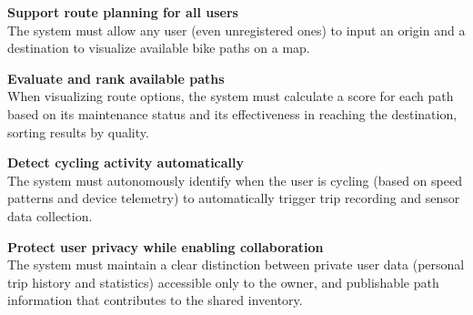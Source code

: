 \begin{enumerate}[label=\textbf{[G\arabic*]:}]
    \item \textbf{Support route planning for all users}
    \\
    The system must allow any user (even unregistered ones) to input an origin and a destination to visualize available bike paths on a map.

    \item \textbf{Evaluate and rank available paths}
    \\
    When visualizing route options, the system must calculate a score for each path based on its maintenance status and its effectiveness in reaching the destination, sorting results by quality.

    \item \textbf{Detect cycling activity automatically}
    \\
    The system must autonomously identify when the user is cycling (based on speed patterns and device telemetry) to automatically trigger trip recording and sensor data collection.

    \item \textbf{Protect user privacy while enabling collaboration}
    \\
    The system must maintain a clear distinction between private user data (personal trip history and statistics) accessible only to the owner, and publishable path information that contributes to the shared inventory.
\end{enumerate}

